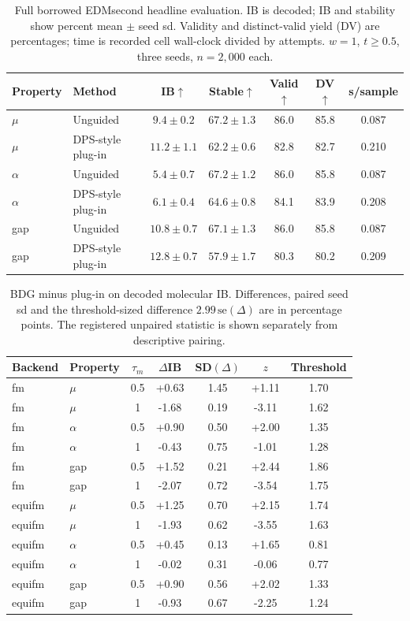 \documentclass{article}
\begin{document}
\begin{table}[!htbp]
\centering\small
\caption{Full borrowed EDMsecond headline evaluation. IB is decoded; IB and stability show percent mean $\pm$ seed sd. Validity and distinct-valid yield (DV) are percentages; time is recorded cell wall-clock divided by attempts. $w=1$, $t\ge0.5$, three seeds, $n=2{,}000$ each.}
\label{tab:full-edm}
\begin{tabular}{llccccc}
\toprule
Property & Method & IB$\uparrow$ & Stable$\uparrow$ & Valid$\uparrow$ & DV$\uparrow$ & s/sample\\
\midrule
$\mu$ & Unguided & $9.4\pm0.2$ & $67.2\pm1.3$ & 86.0 & 85.8 & 0.087\\
$\mu$ & DPS-style plug-in & $11.2\pm1.1$ & $62.2\pm0.6$ & 82.8 & 82.7 & 0.210\\
\midrule
$\alpha$ & Unguided & $5.4\pm0.7$ & $67.2\pm1.2$ & 86.0 & 85.8 & 0.087\\
$\alpha$ & DPS-style plug-in & $6.1\pm0.4$ & $64.6\pm0.8$ & 84.1 & 83.9 & 0.208\\
\midrule
gap & Unguided & $10.8\pm0.7$ & $67.1\pm1.3$ & 86.0 & 85.8 & 0.087\\
gap & DPS-style plug-in & $12.8\pm0.7$ & $57.9\pm1.7$ & 80.3 & 80.2 & 0.209\\
\bottomrule
\end{tabular}
\end{table}
\clearpage
\begin{table}[!htbp]
\centering\small
\caption{BDG minus plug-in on decoded molecular IB. Differences, paired seed sd and the threshold-sized difference $2.99\,\mathrm{se}(\Delta)$ are in percentage points. The registered unpaired statistic is shown separately from descriptive pairing.}
\label{tab:contrasts}
\begin{tabular}{llccccc}
\toprule
Backend & Property & $\tau_m$ & $\Delta$IB & SD$(\Delta)$ & $z$ & Threshold\\
\midrule
fm & $\mu$ & 0.5 & +0.63 & 1.45 & +1.11 & 1.70\\
fm & $\mu$ & 1 & -1.68 & 0.19 & -3.11 & 1.62\\
fm & $\alpha$ & 0.5 & +0.90 & 0.50 & +2.00 & 1.35\\
fm & $\alpha$ & 1 & -0.43 & 0.75 & -1.01 & 1.28\\
fm & gap & 0.5 & +1.52 & 0.21 & +2.44 & 1.86\\
fm & gap & 1 & -2.07 & 0.72 & -3.54 & 1.75\\
equifm & $\mu$ & 0.5 & +1.25 & 0.70 & +2.15 & 1.74\\
equifm & $\mu$ & 1 & -1.93 & 0.62 & -3.55 & 1.63\\
equifm & $\alpha$ & 0.5 & +0.45 & 0.13 & +1.65 & 0.81\\
equifm & $\alpha$ & 1 & -0.02 & 0.31 & -0.06 & 0.77\\
equifm & gap & 0.5 & +0.90 & 0.56 & +2.02 & 1.33\\
equifm & gap & 1 & -0.93 & 0.67 & -2.25 & 1.24\\
\bottomrule
\end{tabular}
\end{table}
\end{document}
